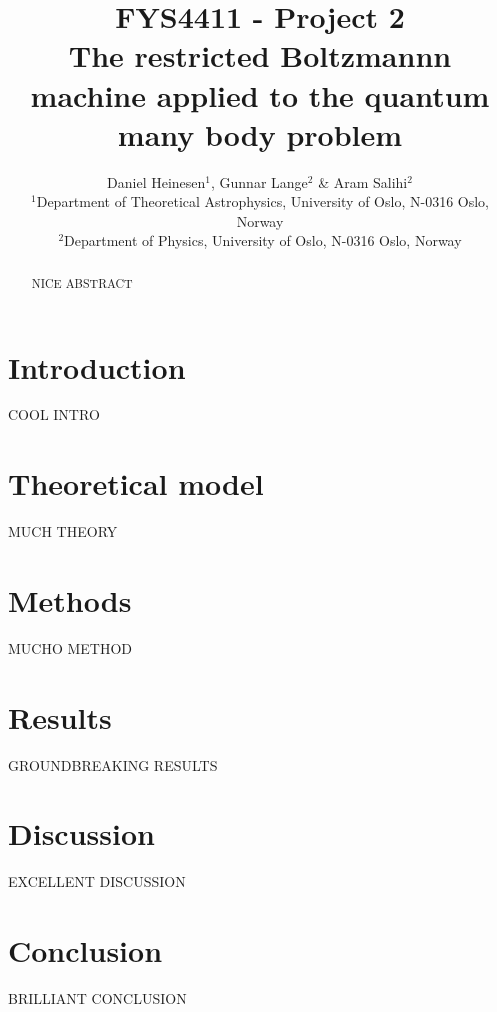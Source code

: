 \documentclass[a4paper, 10pt]{article}
\title{FYS4411 - Project 2\\
	The restricted Boltzmannn machine applied to the quantum many body problem}
\author{Daniel Heinesen$^1$, Gunnar Lange$^2$ \& Aram Salihi$^2$\\
	\small $^1$Department of Theoretical Astrophysics, University of Oslo, N-0316 Oslo, Norway\\
	\small $^2$Department of Physics, University of Oslo, N-0316 Oslo, Norway}
\begin{document}
	\maketitle
	\begin{abstract}
	\begin{center}
	 NICE ABSTRACT
\end{center}
	\end{abstract}
	\newpage
	\tableofcontents
	\newpage
	\section{Introduction}
	COOL INTRO
	\section{Theoretical model}
	MUCH THEORY
	\section{Methods}\label{Method_section}
	MUCHO METHOD
	\section{Results}
	GROUNDBREAKING RESULTS
	\section{Discussion}
	EXCELLENT DISCUSSION
	\section{Conclusion}
	BRILLIANT CONCLUSION
\end{document}
